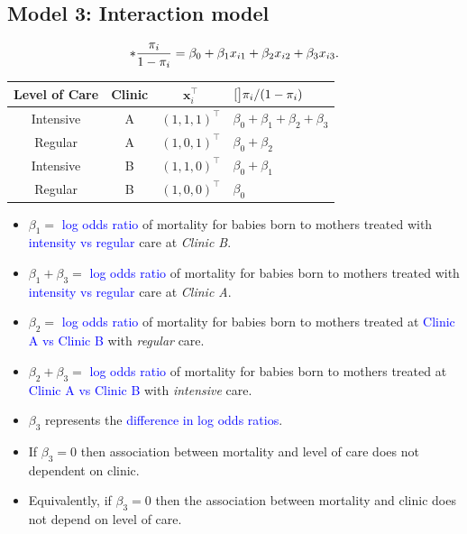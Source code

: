 \documentclass[oneside]{book}\usepackage[]{graphicx}\usepackage[svgnames]{xcolor}
\let\log\relax%
\providecommand{\Vector}[1]{\bm{#1}}%
\begin{document}
\subsection*{Model 3: Interaction model}
\[ \log*{\frac{\pi_i}{1-\pi_i}}=\beta_0+\beta_1x_{i1}+\beta_2x_{i2}+\beta_3x_{i3}. \]
\begin{table}[!htbp]
      \centering
      \begin{tabular}{cccl}
            Level of Care & Clinic & $ \Vector{x}_i^\top $ & $ \log[\big]{\pi_i/(1-\pi_i)} $     \\
            \midrule
            Intensive     & A      & $ (1,1,1)^\top $      & $ \beta_0+\beta_1+\beta_2+\beta_3 $ \\
            Regular       & A      & $ (1,0,1)^\top $      & $ \beta_0+\beta_2 $                 \\
            Intensive     & B      & $ (1,1,0)^\top $      & $ \beta_0+\beta_1 $                 \\
            Regular       & B      & $ (1,0,0)^\top $      & $ \beta_0 $                         \\
            \bottomrule
      \end{tabular}
\end{table}
\begin{itemize}
      \item $ \beta_1= $ \textcolor{Blue}{log odds ratio} of mortality for babies born to mothers treated with
            \textcolor{Blue}{intensity vs regular} care at \emph{Clinic B}.
      \item $ \beta_1+\beta_3= $ \textcolor{Blue}{log odds ratio} of mortality for babies born to mothers treated
            with \textcolor{Blue}{intensity vs regular} care at \emph{Clinic A}.
      \item $ \beta_2= $ \textcolor{Blue}{log odds ratio} of mortality for babies born to mothers treated at
            \textcolor{Blue}{Clinic A vs Clinic B} with \emph{regular} care.
      \item $ \beta_2+\beta_3= $ \textcolor{Blue}{log odds ratio} of mortality for babies born to mothers treated at
            \textcolor{Blue}{Clinic A vs Clinic B} with \emph{intensive} care.
      \item $ \beta_3 $ represents the \textcolor{Blue}{difference in log odds ratios}.
      \item If $ \beta_3=0 $ then association between mortality and level of care does not
            dependent on clinic.
      \item Equivalently, if $ \beta_3=0 $ then the association between mortality and clinic
            does not depend on level of care.
\end{itemize}
\end{document}
